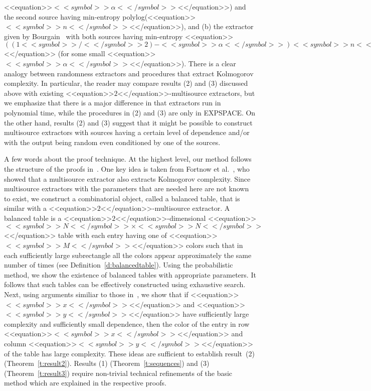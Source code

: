 \documentclass[proceedings]{stacs}
\begin{document}
<<equation>>$<<symbol>>\alpha<</symbol>>$<</equation>>) and the second source having min-entropy polylog(<<equation>>$<<symbol>>n<</symbol>>$<</equation>>), and (b) the extractor given by Bourgain~\cite{bou:j:multiextract} with both sources having min-entropy <<equation>>$((1<<symbol>>/<</symbol>>2) - <<symbol>>\alpha<</symbol>>)<<symbol>>n<</symbol>>$<</equation>> (for some small <<equation>>$<<symbol>>\alpha<</symbol>>$<</equation>>). There is a clear analogy between randomness extractors and procedures that extract Kolmogorov complexity. In particular, the reader may compare results (2) and (3) discussed above  with existing <<equation>>$2$<</equation>>-multisource extractors, but we emphasize that there is a major difference in that extractors run in polynomial time, while the procedures in (2) and (3) are only in EXPSPACE. On the other hand, results (2) and (3) suggest that it might be possible to construct multisource extractors with sources having a certain level of dependence and/or with the output being random even conditioned by one of the sources.

A few words about the proof technique. At the highest level, our method follows the structure of the proofs in~\cite{zim:c:csr}. One key idea is taken from Fortnow et al.~\cite{fhpvw:c:extractKol}, who showed that a multisource extractor also extracts Kolmogorov complexity. Since multisource extractors with the parameters that are needed here are not known to exist, we construct a combinatorial object, called a balanced table, that is similar with a <<equation>>$2$<</equation>>-multisource extractor. A balanced table is a  <<equation>>$2$<</equation>>-dimensional <<equation>>$<<symbol>>N<</symbol>> \times <<symbol>>N<</symbol>>$<</equation>> table with each entry having one of <<equation>>$<<symbol>>M<</symbol>>$<</equation>> colors such that in each sufficiently large subrectangle all the colors appear approximately the same number of times (see Definition~\ref{d:balancedtable}). Using the probabilistic method, we show the existence of balanced tables with appropriate parameters. It follows that such tables can be effectively constructed using exhaustive search. Next, using arguments similiar to those in~\cite{fhpvw:c:extractKol}, we show that if <<equation>>$<<symbol>>x<</symbol>>$<</equation>> and <<equation>>$<<symbol>>y<</symbol>>$<</equation>> have sufficiently large  complexity and sufficiently small dependence, then the color of the entry in row <<equation>>$<<symbol>>x<</symbol>>$<</equation>> and column <<equation>>$<<symbol>>y<</symbol>>$<</equation>> of the table has large complexity. These ideas are sufficient to establish result~(2) (Theorem~\ref{t:result2}).  Results (1) (Theorem~\ref{t:sequences}) and (3) (Theorem~\ref{t:result3}) require non-trivial technical refinements of the basic method which are explained in the respective proofs.
\end{document}

